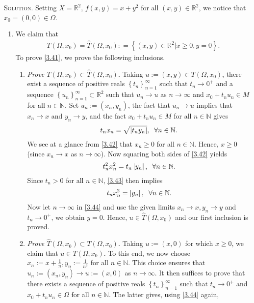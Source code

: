 \documentclass[a4paper]{article}
\numberwithin{equation}{section}
\begin{document}
\textsc{Solution.} Setting $X=\mathbb{R}^2$, $f\left(x,y\right)=x+y^2$ for all $\left(x,y\right)\in \mathbb{R}^2$, we notice that $x_0=\left(0,0\right)\in \Omega$.
\begin{enumerate}
\item We claim that
\begin{align}
\label{3.41}
T\left( {\Omega ,{x_0}} \right) = \widehat T\left( {\Omega ,{x_0}} \right): = \left\{ {\left( {x,y} \right) \in {\mathbb{R}^2}|x \ge 0,y = 0} \right\}.
\end{align}
To prove \eqref{3.41}, we prove the following inclusions.
\begin{enumerate}
\item \textit{Prove $T\left( {\Omega ,{x_0}} \right) \subset \widehat T\left( {\Omega ,{x_0}} \right)$.} Taking $u:=\left(x,y\right)\in T\left(\Omega,x_0\right)$, there exist a sequence of positive reals $\left\{ {{t_n}} \right\}_{n = 1}^\infty $ such that $t_n\to 0^+$ and a sequence $\left\{ {{u_n}} \right\}_{n = 1}^\infty  \subset {\mathbb{R}^2}$ such that $u_n\to u$ as $n\to \infty$ and $x_0+t_nu_n\in M$ for all $n\in \mathbb{N}$. Set $u_n:=\left(x_n,y_n\right)$, the fact that $u_n\to u$ implies that $x_n\to x$ and $y_n\to y$, and the fact $x_0+t_nu_n\in M$ for all $n\in \mathbb{N}$ gives
\begin{align}
\label{3.42}
{t_n}{x_n} = \sqrt {\left| {{t_n}{y_n}} \right|} ,\hspace{0.2cm}\forall n \in \mathbb{N}.
\end{align}
We see at a glance from \eqref{3.42} that $x_n\ge 0$ for all $n\in \mathbb{N}$. Hence, $x\ge 0$ (since $x_n\to x$ as $n\to \infty$). Now squaring both sides of \eqref{3.42} yields
\begin{align}
\label{3.43}
t_n^2x_n^2 = {t_n}\left| {{y_n}} \right|,\hspace{0.2cm}\forall n \in \mathbb{N}.
\end{align}
Since $t_n>0$ for all $n\in \mathbb{N}$, \eqref{3.43} then implies
\begin{align}
\label{3.44}
{t_n}x_n^2 = \left| {{y_n}} \right|,\hspace{0.2cm}\forall n \in \mathbb{N}.
\end{align}
Now let $n\to \infty$ in \eqref{3.44} and use the given limits $x_n\to x,y_n\to y$ and $t_n\to 0^+$, we obtain $y=0$. Hence, $u\in \widehat{T}\left(\Omega,x_0\right)$ and our first inclusion is proved.
\item \textit{Prove $\widehat T\left( {\Omega ,{x_0}} \right) \subset T\left( {\Omega ,{x_0}} \right)$.} Taking $u:=\left(x,0\right)$ for which $x\ge 0$, we claim that $u\in T\left(\Omega,x_0\right)$. To this end, we now choose $x_n:=x+\frac{1}{n}, y_n:=\frac{1}{n^3}$ for all $n\in \mathbb{N}$. This choice ensures that $u_n:=\left(x_n,y_n\right)\to u:=\left(x,0\right)$ as $n\to \infty$. It then suffices to prove that there exists a sequence of positive reals $\left\{ {{t_n}} \right\}_{n = 1}^\infty $ such that $t_n\to 0^+$ and $x_0+t_nu_n\in \Omega$ for all $n\in \mathbb{N}$. The latter gives, using \eqref{3.44} again,

\end{enumerate}
\end{enumerate}
\end{document}
